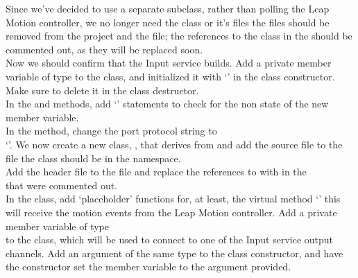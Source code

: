 Since we've decided to use a separate  subclass, rather than
polling the Leap Motion controller, we no longer need the 
class or it's files \longDash{} the files should be removed from the project and the
 file; the references to the
 class in the  should be
commented out, as they will be replaced soon.\\

Now we should confirm that the Input service builds.
\tertiaryEnd{}
Add a private member variable of type  to the
 class, and initialized it with
`' in the class constructor.
Make sure to delete it in the class destructor.\\

In the  and
 methods, add `' statements to
check for the non\longDash{} state of the new member variable.\\

In the  method, change the
port protocol string to\\
`'.
\tertiaryEnd{}
We now create a new  class, , that derives
from  and add the source file to the
 file \longDash{} the class should be in the
 namespace.\\

Add the header file  to the file
 and replace the references to
 with  in the\\
 that were commented out.\\

In the  class, add `placeholder' functions for, at least,
the virtual method `' \longDash{} this will receive the motion events from
the Leap Motion controller.
Add a private member variable of type\\
 to the class, which will be used to connect to one of
the Input service output channels.
Add an argument of the same type to the class constructor, and have the constructor set
the member variable to the argument provided.\\

